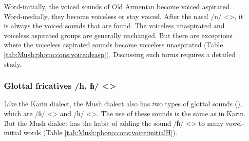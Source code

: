 
Word-initially, the voiced sounds of Old Armenian become voiced aspirated. Word-medially, they become voiceless or stay voiced. After the nasal /n/ <>, it is always the voiced sounds that are found. The voiceless unaspirated and voiceless aspirated groups are generally unchanged. But there are exceptions where the voiceless aspirated sounds became voiceless unaspirated (Table \ref{tab:Mush:phono:cons:voice:deasp}). Discussing such forms requires a detailed study. 

\begin{table}[H]
	\centering
	\caption{Deaspiration from Classical Armenian voiced aspirated sounds in the Mush dialect}
	\label{tab:Mush:phono:cons:voice:deasp}
\end{table}

\subsubsection{Glottal fricatives /h, ɦ/ <>}


Like the Karin dialect, the Mush dialect also has two types of glottal sounds (), which are /ɦ/ <> and /h/ <>. The use of these sounds is the same as in Karin. But the Mush dialect has the habit of adding the sound /ɦ/ <> to many vowel-initial words (Table \ref{tab:Mush:phono:cons:voice:initialH}). 


